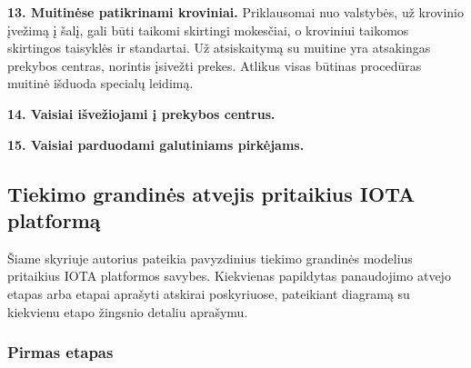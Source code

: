 \medskip \noindent \textbf{13. Muitinėse patikrinami kroviniai.} Priklausomai nuo valstybės, už krovinio įvežimą į šalį, gali būti taikomi skirtingi mokesčiai, o kroviniui taikomos skirtingos taisyklės ir standartai. Už atsiskaitymą su muitine yra atsakingas prekybos centras, norintis įsivežti prekes. Atlikus visas būtinas procedūras muitinė išduoda specialų leidimą.

\medskip \noindent \textbf{14. Vaisiai išvežiojami į prekybos centrus.}

\medskip \noindent \textbf{15. Vaisiai parduodami galutiniams pirkėjams.}




\subsection{Tiekimo grandinės atvejis pritaikius IOTA platformą}

Šiame skyriuje autorius pateikia pavyzdinius tiekimo grandinės modelius pritaikius IOTA platformos savybes. Kiekvienas papildytas panaudojimo atvejo etapas arba etapai aprašyti atskirai poskyriuose, pateikiant diagramą su kiekvienu etapo žingsnio detaliu aprašymu.




\subsubsection{Pirmas etapas}

